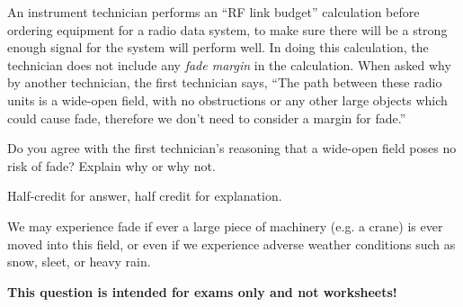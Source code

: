 

An instrument technician performs an ``RF link budget'' calculation before ordering equipment for a radio data system, to make sure there will be a strong enough signal for the system will perform well.  In doing this calculation, the technician does not include any {\it fade margin} in the calculation.  When asked why by another technician, the first technician says, ``The path between these radio units is a wide-open field, with no obstructions or any other large objects which could cause fade, therefore we don't need to consider a margin for fade.''

\vskip 10pt

Do you agree with the first technician's reasoning that a wide-open field poses no risk of fade?  Explain why or why not.







Half-credit for answer, half credit for explanation.

\vskip 10pt

We may experience fade if ever a large piece of machinery (e.g. a crane) is ever moved into this field, or even if we experience adverse weather conditions such as snow, sleet, or heavy rain.







{\bf This question is intended for exams only and not worksheets!}



